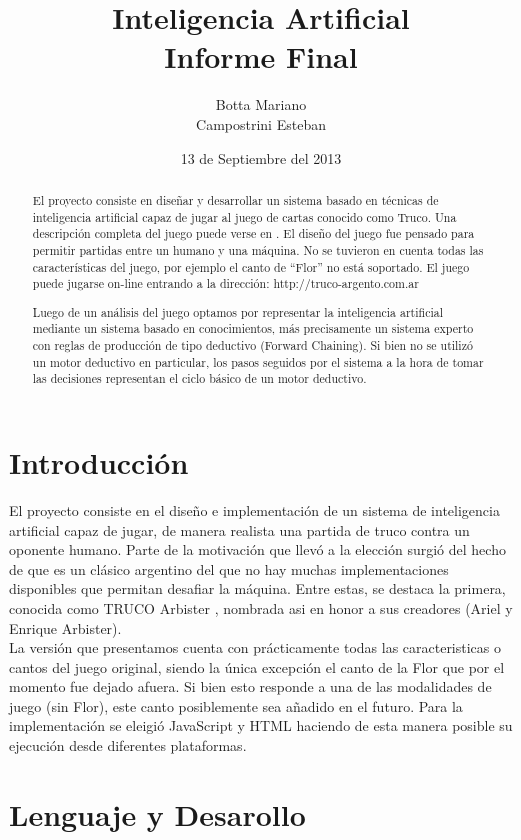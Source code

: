 \documentclass[12pt,a4paper]{article}
\title{Inteligencia Artificial\\ 
\large Informe Final
}
\author{Botta Mariano \\ Campostrini Esteban}
\date{ \small 13 de Septiembre del 2013}
\begin{document}
\maketitle 

\begin{abstract}
El proyecto consiste en dise\~nar y desarrollar un sistema basado en t\'ecnicas de inteligencia artificial capaz de jugar al 
juego de cartas conocido como Truco.
Una descripci\'on completa del juego puede verse en \cite{reglas}. El dise\~no del juego fue pensado para permitir partidas 
entre un humano y una m\'aquina. No se tuvieron en cuenta todas las caracter\'isticas del juego, por ejemplo el canto de ``Flor'' 
no est\'a soportado. El juego puede jugarse on-line entrando a la direcci\'on: http://truco-argento.com.ar

Luego de un an\'alisis del juego optamos por representar la inteligencia artificial mediante un sistema basado en conocimientos, 
m\'as precisamente un sistema experto con reglas de producci\'on de tipo deductivo (Forward Chaining). Si bien no se utiliz\'o un motor
deductivo en particular, los pasos seguidos por el sistema a la hora de tomar las decisiones representan el ciclo b\'asico de un motor deductivo.
\end{abstract}
\pagebreak

\section{Introducci\'on}
El proyecto consiste en el dise\~no e implementaci\'on de un sistema de inteligencia artificial capaz de jugar, de manera realista
una partida de truco contra un oponente humano. Parte de la motivaci\'on que llev\'o a la elecci\'on surgi\'o del hecho de
que es un cl\'asico argentino del que no hay muchas implementaciones disponibles que permitan desafiar la m\'aquina. Entre
estas, se destaca la primera, conocida como TRUCO Arbister \cite{arbister}, nombrada asi en honor a sus creadores (Ariel y Enrique Arbister).\\
La versi\'on que presentamos cuenta con pr\'acticamente todas las caracteristicas o cantos del juego original, siendo la
\'unica excepci\'on el canto de la Flor que por el momento fue dejado afuera. Si bien esto responde a una de las modalidades de 
juego (sin Flor), este canto posiblemente sea a\~nadido en el futuro.
Para la implementaci\'on se eleigi\'o JavaScript y HTML haciendo de esta manera posible su ejecuci\'on desde diferentes plataformas. 


\section{Lenguaje y Desarollo}
\end{document}
